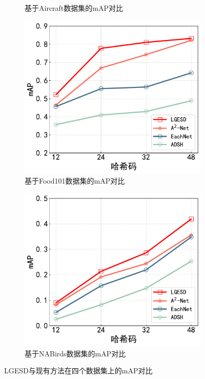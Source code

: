 \begin{figure}[h]
\begin{subfigure}{0.48\textwidth}
    \caption{基于Aircraft数据集的mAP对比}\label{fig:4-30}
  \end{subfigure}
  \hfil
  \begin{subfigure}{0.48\textwidth}
    \centering
    \includegraphics[width=\linewidth]{./Img/Food-R50.pdf}
    \caption{基于Food101数据集的mAP对比}\label{fig:4-31}
  \end{subfigure}
  \hfil
  \begin{subfigure}{0.48\textwidth}
    \centering
    \includegraphics[width=\linewidth]{./Img/Nabirds-R50.pdf}
    \caption{基于NABirds数据集的mAP对比}\label{fig:4-32}
  \end{subfigure}
  \caption{LGESD与现有方法在四个数据集上的mAP对比}
  \label{fig:4-32-a}
\end{figure}

